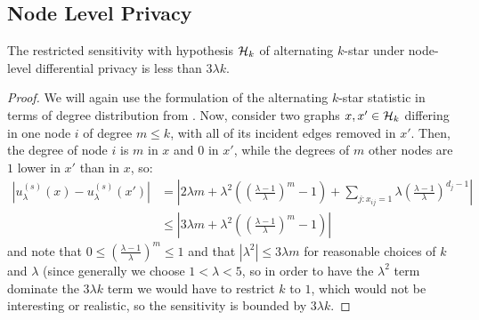 \subsection{Node Level Privacy}

\begin{claim}
The restricted sensitivity with hypothesis $\mathcal{H}_k$ of alternating $k$-star under node-level differential privacy is less than $3\lambda k$.
\end{claim}
\begin{proof}
We will again use the formulation of the alternating $k$-star statistic in terms of degree distribution from . Now, consider two graphs $x, x' \in \mathcal{H}_k$ differing in one node $i$ of degree $m \leq k$, with all of its incident edges removed in $x'$. Then, the degree of node $i$ is $m$ in $x$ and $0$ in $x'$, while the degrees of $m$ other nodes are $1$ lower in $x'$ than in $x$, so:
\begin{align*}
|u_\lambda^{(s)}(x) - u_\lambda^{(s)}(x')| & = \left|2\lambda m + \lambda^2\left( \left(\frac{\lambda - 1}{\lambda}\right)^m - 1\right) +\sum_{j: x_{ij} = 1} \lambda \left(\frac{\lambda - 1}{\lambda}\right)^{d_j - 1}  \right| \\
& \leq \left|3\lambda m +  \lambda^2\left( \left(\frac{\lambda - 1}{\lambda}\right)^m - 1\right)\right|
\end{align*}
and note that $0 \leq \left(\frac{\lambda - 1}{\lambda}\right)^m \leq 1$ and that $|\lambda^2| \leq 3\lambda m$ for reasonable choices of $k$ and $\lambda$ (since generally we choose $1 < \lambda < 5$, so in order to have the $\lambda^2$ term dominate the $3\lambda k$ term we would have to restrict $k$ to $1$, which would not be interesting or realistic, so the sensitivity is bounded by $3\lambda k$.
\end{proof}

